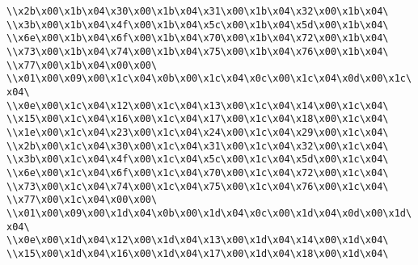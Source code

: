 \verb|\\x2b\x00\x1b\x04\x30\x00\x1b\x04\x31\x00\x1b\x04\x32\x00\x1b\x04\|\newline
\verb|\\x3b\x00\x1b\x04\x4f\x00\x1b\x04\x5c\x00\x1b\x04\x5d\x00\x1b\x04\|\newline
\verb|\\x6e\x00\x1b\x04\x6f\x00\x1b\x04\x70\x00\x1b\x04\x72\x00\x1b\x04\|\newline
\verb|\\x73\x00\x1b\x04\x74\x00\x1b\x04\x75\x00\x1b\x04\x76\x00\x1b\x04\|\newline
\verb|\\x77\x00\x1b\x04\x00\x00\|\newline
\verb|\\x01\x00\x09\x00\x1c\x04\x0b\x00\x1c\x04\x0c\x00\x1c\x04\x0d\x00\x1c\x04\|\newline
\verb|\\x0e\x00\x1c\x04\x12\x00\x1c\x04\x13\x00\x1c\x04\x14\x00\x1c\x04\|\newline
\verb|\\x15\x00\x1c\x04\x16\x00\x1c\x04\x17\x00\x1c\x04\x18\x00\x1c\x04\|\newline
\verb|\\x1e\x00\x1c\x04\x23\x00\x1c\x04\x24\x00\x1c\x04\x29\x00\x1c\x04\|\newline
\verb|\\x2b\x00\x1c\x04\x30\x00\x1c\x04\x31\x00\x1c\x04\x32\x00\x1c\x04\|\newline
\verb|\\x3b\x00\x1c\x04\x4f\x00\x1c\x04\x5c\x00\x1c\x04\x5d\x00\x1c\x04\|\newline
\verb|\\x6e\x00\x1c\x04\x6f\x00\x1c\x04\x70\x00\x1c\x04\x72\x00\x1c\x04\|\newline
\verb|\\x73\x00\x1c\x04\x74\x00\x1c\x04\x75\x00\x1c\x04\x76\x00\x1c\x04\|\newline
\verb|\\x77\x00\x1c\x04\x00\x00\|\newline
\verb|\\x01\x00\x09\x00\x1d\x04\x0b\x00\x1d\x04\x0c\x00\x1d\x04\x0d\x00\x1d\x04\|\newline
\verb|\\x0e\x00\x1d\x04\x12\x00\x1d\x04\x13\x00\x1d\x04\x14\x00\x1d\x04\|\newline
\verb|\\x15\x00\x1d\x04\x16\x00\x1d\x04\x17\x00\x1d\x04\x18\x00\x1d\x04\|\newline
